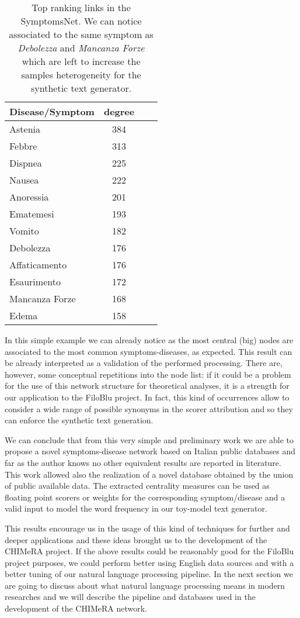 \documentclass{standalone}
\begin{document}
\begin{table}[htbp]
\centering
\begin{tabular}{lccc}
\hline \rowcolor{darkgrayrow}
Disease/Symptom & degree \\
\hline
Astenia         & 384    \\
Febbre          & 313    \\
Dispnea         & 225    \\
Nausea          & 222    \\
Anoressia       & 201    \\
Ematemesi       & 193    \\
Vomito          & 182    \\
Debolezza       & 176    \\
Affaticamento   & 176    \\
Esaurimento     & 172    \\
Mancanza Forze  & 168    \\
Edema           & 158    \\
\hline
\end{tabular}
\caption{Top ranking links in the \textsf{SymptomsNet}. We can notice  associated to the same symptom as \emph{Debolezza} and \emph{Mancanza Forze} which are left to increase the samples heterogeneity for the synthetic text generator.}
\label{tab:rank}
\end{table}

In this simple example we can already notice as the most central (big) nodes are associated to the most common symptoms-diseases, as expected.
This result can be already interpreted as a validation of the performed processing.
There are, however, some conceptual repetitions into the node list: if it could be a problem for the use of this network structure for theoretical analyses, it is a strength for our application to the FiloBlu project.
In fact, this kind of occurrences allow to consider a wide range of possible synonyms in the scorer attribution and so they can enforce the synthetic text generation.

We can conclude that from this very simple and preliminary work we are able to propose a novel symptoms-disease network based on Italian public databases and far as the author knows no other equivalent results are reported in literature.
This work allowed also the realization of a novel database obtained by the union of public available data.
The extracted centrality measures can be used as floating point scorers or weights for the corresponding symptom/disease and a valid input to model the word frequency in our toy-model text generator.

This results encourage us in the usage of this kind of techniques for further and deeper applications and these ideas brought us to the development of the \textsf{CHIMeRA} project.
If the above results could be reasonably good for the FiloBlu project purposes, we could perform better using English data sources and with a better tuning of our natural language processing pipeline.
In the next section we are going to discuss about what natural language processing means in modern researches and we will describe the pipeline and databases used in the development of the \textsf{CHIMeRA} network.
\end{document}
